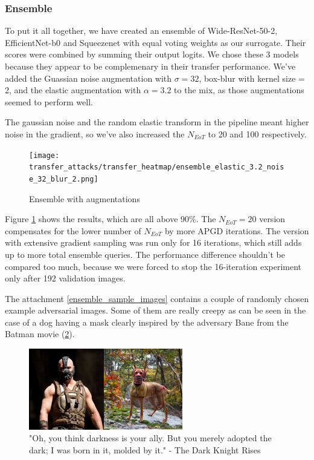 \pagebreak
\subsubsection{Ensemble}
\label{ensemble}
To put it all together, we have created an ensemble of Wide-ResNet-50-2, EfficientNet-b0 and Squeezenet with equal voting weights as our surrogate. Their scores were combined by summing their output logits. We chose these 3 models because they appear to be complemenary in their transfer performance. We've added the Guassian noise augmentation with $\sigma = 32$, box-blur with kernel size = 2, and the elastic augmentation with $\alpha = 3.2$ to the mix, as those augmentations seemed to perform well.

The gaussian noise and the random elastic transform in the pipeline meant higher noise in the gradient, so we've also increased the $N_{EoT}$ to 20 and 100 respectively.

\begin{figure}
    \centering
    \texttt{[image: transfer\_attacks/transfer\_heatmap/ensemble\_elastic\_3.2\_noise\_32\_blur\_2.png]}
    \caption{Ensemble with augmentations}
    \label{fig:ensemble_augment}
\end{figure}

Figure \ref{fig:ensemble_augment} shows the results, which are all above 90\%. The $N_{EoT}=20$ version compensates for the lower number of $N_{EoT}$ by more APGD iterations. The version with extensive gradient sampling was run only for 16 iterations, which still adds up to more total ensemble queries. The performance difference shouldn't be compared too much, because we were forced to stop the 16-iteration experiment only after 192 validation images.

The attachment \ref{ensemble_sample_images} contains a couple of randomly chosen example adversarial images. Some of them are really creepy as can be seen in the case of a dog having a mask clearly inspired by the adversary Bane from the Batman movie (\ref{fig:bane_dog}).

\begin{figure}
    \centering
    \includegraphics[width=0.60\textwidth]{ae_samples/bane.png}
    \caption{"Oh, you think darkness is your ally. But you merely adopted the dark; I was born in it, molded by it." - The Dark Knight Rises}
    \label{fig:bane_dog}
\end{figure}
\pagebreak


